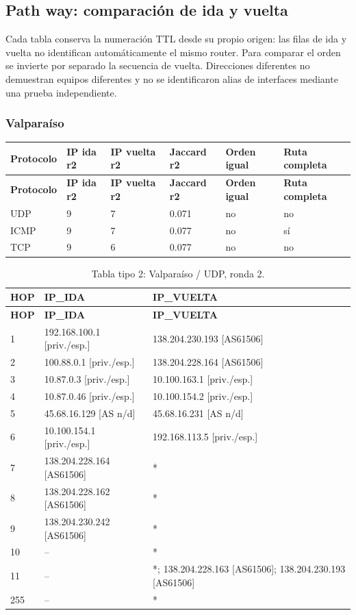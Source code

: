 \subsection{Path way: comparación de ida y vuelta}\label{sec:vuelta}
Cada tabla conserva la numeración TTL desde su propio origen: las filas de ida y vuelta no identifican automáticamente el mismo router. Para comparar el orden se invierte por separado la secuencia de vuelta. Direcciones diferentes no demuestran equipos diferentes y no se identificaron alias de interfaces mediante una prueba independiente.

\subsubsection{Valparaíso}
\begingroup
\fontsize{9}{11}\selectfont
\addtocounter{table}{-1}
\begin{longtable}{p{2.1cm}p{1.7cm}p{2cm}p{2cm}p{2.2cm}p{2.7cm}}
\toprule
\textbf{Protocolo} & \textbf{IP ida r2} & \textbf{IP vuelta r2} & \textbf{Jaccard r2} & \textbf{Orden igual} & \textbf{Ruta completa} \\ \midrule
\endfirsthead
\toprule
\textbf{Protocolo} & \textbf{IP ida r2} & \textbf{IP vuelta r2} & \textbf{Jaccard r2} & \textbf{Orden igual} & \textbf{Ruta completa} \\ \midrule
\endhead
UDP & 9 & 7 & 0.071 & no & no \\
ICMP & 9 & 7 & 0.077 & no & sí \\
TCP & 9 & 6 & 0.077 & no & no \\
\bottomrule
\end{longtable}
\endgroup
\begingroup
\fontsize{9}{11}\selectfont
\begin{longtable}{p{0.95cm}p{7.075cm}p{7.075cm}}
\caption{Tabla tipo 2: Valparaíso / UDP, ronda 2.}\label{tabla2:138.204.230.242:UDP} \\
\toprule
\textbf{HOP} & \textbf{IP\_\allowbreak{}IDA} & \textbf{IP\_\allowbreak{}VUELTA} \\ \midrule
\endfirsthead
\toprule
\textbf{HOP} & \textbf{IP\_\allowbreak{}IDA} & \textbf{IP\_\allowbreak{}VUELTA} \\ \midrule
\endhead
1 & 192.168.100.1 [priv./esp.] & 138.204.230.193 [AS61506] \\
2 & 100.88.0.1 [priv./esp.] & 138.204.228.164 [AS61506] \\
3 & 10.87.0.3 [priv./esp.] & 10.100.163.1 [priv./esp.] \\
4 & 10.87.0.46 [priv./esp.] & 10.100.154.2 [priv./esp.] \\
5 & 45.68.16.129 [AS n/d] & 45.68.16.231 [AS n/d] \\
6 & 10.100.154.1 [priv./esp.] & 192.168.113.5 [priv./esp.] \\
7 & 138.204.228.164 [AS61506] & * \\
8 & 138.204.228.162 [AS61506] & * \\
9 & 138.204.230.242 [AS61506] & * \\
10 & -- & * \\
11 & -- & *; 138.204.228.163 [AS61506]; 138.204.230.193 [AS61506] \\
255 & -- & * \\
\bottomrule
\end{longtable}
